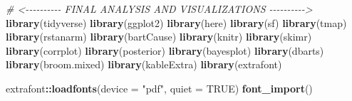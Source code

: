 \documentclass[
  12pt,
]{article}
\newenvironment{Shaded}{\begin{snugshade}}{\end{snugshade}}
\newcommand{\AttributeTok}[1]{\textcolor[rgb]{0.13,0.29,0.53}{#1}}
\newcommand{\CommentTok}[1]{\textcolor[rgb]{0.56,0.35,0.01}{\textit{#1}}}
\newcommand{\ConstantTok}[1]{\textcolor[rgb]{0.56,0.35,0.01}{#1}}
\newcommand{\FunctionTok}[1]{\textcolor[rgb]{0.13,0.29,0.53}{\textbf{#1}}}
\newcommand{\NormalTok}[1]{#1}
\newcommand{\SpecialCharTok}[1]{\textcolor[rgb]{0.81,0.36,0.00}{\textbf{#1}}}
\newcommand{\StringTok}[1]{\textcolor[rgb]{0.31,0.60,0.02}{#1}}
\begin{document}
\begin{Shaded}
\begin{Highlighting}[]
\CommentTok{\# \textless{}{-}{-}{-}{-}{-}{-}{-}{-}{-}{-} FINAL ANALYSIS AND VISUALIZATIONS {-}{-}{-}{-}{-}{-}{-}{-}{-}{-}\textgreater{}}
\FunctionTok{library}\NormalTok{(tidyverse)}
\FunctionTok{library}\NormalTok{(ggplot2)}
\FunctionTok{library}\NormalTok{(here)}
\FunctionTok{library}\NormalTok{(sf)}
\FunctionTok{library}\NormalTok{(tmap)}
\FunctionTok{library}\NormalTok{(rstanarm)}
\FunctionTok{library}\NormalTok{(bartCause)}
\FunctionTok{library}\NormalTok{(knitr)}
\FunctionTok{library}\NormalTok{(skimr)}
\FunctionTok{library}\NormalTok{(corrplot)}
\FunctionTok{library}\NormalTok{(posterior)}
\FunctionTok{library}\NormalTok{(bayesplot)}
\FunctionTok{library}\NormalTok{(dbarts)}
\FunctionTok{library}\NormalTok{(broom.mixed)}
\FunctionTok{library}\NormalTok{(kableExtra)}
\FunctionTok{library}\NormalTok{(extrafont)}

\NormalTok{extrafont}\SpecialCharTok{::}\FunctionTok{loadfonts}\NormalTok{(}\AttributeTok{device =} \StringTok{"pdf"}\NormalTok{, }\AttributeTok{quiet =} \ConstantTok{TRUE}\NormalTok{)}
\FunctionTok{font\_import}\NormalTok{()}


\end{Highlighting}
\end{Shaded}
\end{document}
